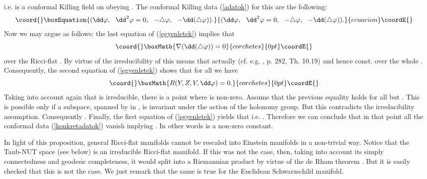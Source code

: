 \documentclass[a4paper,12pt,draft]{article}
\begin{document}
i.e. \coordHE{} is a conformal Killing field on \coordHE{} obeying 
\coordHE{}. The conformal Killing data
(\ref{adatok}) for this \coordHE{} are the following:
\begin{equation}\coord{}\boxEquation{
(\dd\varphi ,\:\:\:\dd^2\varphi =0,\:\:\: -\triangle\varphi ,\:\:\:-\dd
(\triangle\varphi )).
\label{konkretadatok}
}{
(\dd\varphi ,\:\:\:\dd^2\varphi =0,\:\:\: -\triangle\varphi ,\:\:\:-\dd
(\triangle\varphi )).
}{ecuacion}\coordE{}\end{equation}
Now we may argue as follows: the last equation of
(\ref{egyenletek}) implies that 
\[\coord{}\boxMath{\nabla ( \dd (\triangle\varphi ))=0}{corchetes}{0pt}\coordE{}\]
over the Ricci-flat \coordHE{}. By virtue of the irreducibility of
\coordHE{} this means that actually \coordHE{} (cf.
e.g. \cite{bes}, p. 282, Th. 10.19) and hence \myHighlight{$\triangle\varphi
=$}\coordHE{}const. over the whole \coordHE{}. Consequently, the second equation of
(\ref{egyenletek}) shows that for all \coordHE{} we have
\[\coord{}\boxMath{R(Y,Z,V, \dd\varphi )=0.}{corchetes}{0pt}\coordE{}\]
Taking into account again that \coordHE{} is irreducible, there is a point
where \coordHE{} is non-zero. Assume that the previous equality holds for all
\coordHE{} but \coordHE{}. This is possible only if a
subspace, spanned by \coordHE{} in \coordHE{}, is invariant under the
action of the holonomy group. But this contradicts the irreducibility
assumption. Consequently \coordHE{}. Finally, the first equation of
(\ref{egyenletek}) yields that \coordHE{} 
i.e. \coordHE{}. Therefore we can conclude that in that
point all the conformal data (\ref{konkretadatok}) vanish implying \coordHE{}.
In other words \myHighlight{$\varphi$}\coordHE{} is a non-zero constant. \myHighlight{$\Diamond$}\coordHE{}
\vspace{0.1in}

\noindent In light of this proposition, general Ricci-flat 
manifolds cannot be rescaled into Einstein manifolds in a non-trivial
way. Notice that the Taub-NUT space (see below) is
an irreducible Ricci-flat manifold. If this was not the
case, then, taking into account its simply connectedness and geodesic
completeness, it would split into a Riemannian product 
\coordHE{} by virtue of the de Rham theorem
\cite{deR}. But it is easily checked that this is not the case. We just
remark that the same is true for the Euclidean Schwarzschild manifold. 
\end{document}
